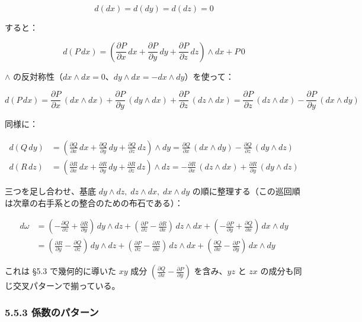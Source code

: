 \documentclass[a4paper,12pt,openany]{book}
\begin{document}
\[d(dx) = d(dy) = d(dz) = 0\]

すると：

\[d(P\,dx) = (\frac{\partial P}{\partial x}\,dx + \frac{\partial P}{\partial y}\,dy + \frac{\partial P}{\partial z}\,dz) \wedge dx + P\,0\]

\(\wedge\)
の反対称性（\(dx \wedge dx = 0\)、\(dy \wedge dx = -dx \wedge dy\)）を使って：

\[d(P\,dx) = \frac{\partial P}{\partial x}\,(dx \wedge dx) + \frac{\partial P}{\partial y}\,(dy \wedge dx) + \frac{\partial P}{\partial z}\,(dz \wedge dx) = \frac{\partial P}{\partial z}\,(dz \wedge dx) - \frac{\partial P}{\partial y}\,(dx \wedge dy)\]

同様に：

\[\begin{aligned}
d(Q\,dy) &= (\frac{\partial Q}{\partial x}\,dx + \frac{\partial Q}{\partial y}\,dy + \frac{\partial Q}{\partial z}\,dz) \wedge dy = \frac{\partial Q}{\partial x}\,(dx \wedge dy) - \frac{\partial Q}{\partial z}\,(dy \wedge dz) \\
d(R\,dz) &= (\frac{\partial R}{\partial x}\,dx + \frac{\partial R}{\partial y}\,dy + \frac{\partial R}{\partial z}\,dz) \wedge dz = -\frac{\partial R}{\partial x}\,(dz \wedge dx) + \frac{\partial R}{\partial y}\,(dy \wedge dz)
\end{aligned}\]

三つを足し合わせ、基底 \(dy \wedge dz,\; dz \wedge dx,\; dx \wedge dy\)
の順に整理する（この巡回順は次章の右手系との整合のための布石である）：

\[\begin{aligned}
d\omega &= (-\frac{\partial Q}{\partial z} + \frac{\partial R}{\partial y})\,dy \wedge dz + (\frac{\partial P}{\partial z} - \frac{\partial R}{\partial x})\,dz \wedge dx + (-\frac{\partial P}{\partial y} + \frac{\partial Q}{\partial x})\,dx \wedge dy \\
&= (\frac{\partial R}{\partial y} - \frac{\partial Q}{\partial z})\,dy \wedge dz + (\frac{\partial P}{\partial z} - \frac{\partial R}{\partial x})\,dz \wedge dx + (\frac{\partial Q}{\partial x} - \frac{\partial P}{\partial y})\,dx \wedge dy
\end{aligned}\]

これは §5.3 で幾何的に導いた \(xy\) 成分
\((\frac{\partial Q}{\partial x}-\frac{\partial P}{\partial y})\)
を含み、\(yz\) と \(zx\) の成分も同じ交叉パターンで揃っている。

\hypertarget{ux4fc2ux6570ux306eux30d1ux30bfux30fcux30f3}{%
\subsubsection{5.5.3
係数のパターン}\label{ux4fc2ux6570ux306eux30d1ux30bfux30fcux30f3}}
\end{document}
